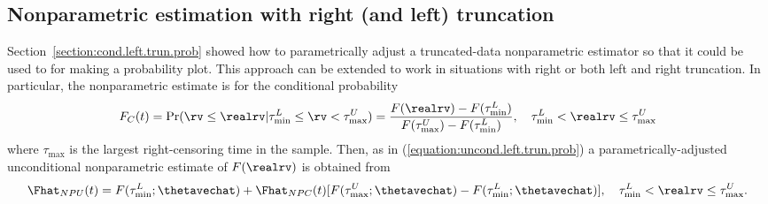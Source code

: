 \subsection{Nonparametric estimation with right (and left) truncation}
\label{section:np.par.corr.right.trun}
Section~\ref{section:cond.left.trun.prob} showed how to parametrically
adjust a truncated-data nonparametric estimator so that it could be
used to for making a probability plot. This approach can be extended
to work in situations with right or both left and right truncation.
In particular, the nonparametric estimate is for the conditional probability
\begin{equation}
\label{equation:cond.right.trun.prob}
F_{C}(t) = \Pr(\rv\leq\realrv |  \tau^{L}_{\min} \leq\rv<\tau^{U}_{\max}) =
	\frac{F(\realrv)-F(\tau_{\min}^{L})}{  F(\tau^{U}_{\max})  -  
	F(\tau^{L}_{\min})},\quad \tau^{L}_{\min} < \realrv\leq\tau^{U}_{\max}
\end{equation}
where $\tau_{\max}$ is the largest right-censoring time in the
sample.  Then, as in (\ref{equation:uncond.left.trun.prob}) a
parametrically-adjusted unconditional nonparametric estimate of
$F(\realrv)$ is obtained from
\begin{equation}
\label{equation:uncond.right.trun.prob}
\Fhat_{NPU}(t) = F(\tau^{L}_{\min};\thetavechat) +  
	\Fhat_{NPC}(t)[F(\tau^{U}_{\max};\thetavechat) -
F(\tau^{L}_{\min};\thetavechat) ] , \quad
 \tau^{L}_{\min} < \realrv \leq \tau^{U}_{\max}.
\end{equation}



